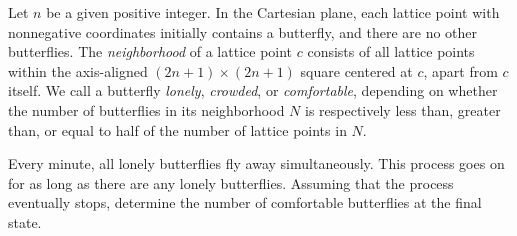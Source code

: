 Let $n$ be a given positive integer. In the Cartesian plane, each lattice point with nonnegative coordinates initially contains a butterfly, and there are no other butterflies. The \emph{neighborhood} of a lattice point $c$ consists of all lattice points within the axis-aligned $(2n+1) \times (2n+1)$ square centered at $c$, apart from $c$ itself. We call a butterfly \emph{lonely}, \emph{crowded}, or \emph{comfortable}, depending on whether the number of butterflies in its neighborhood $N$ is respectively less than, greater than, or equal to half of the number of lattice points in $N$.

Every minute, all lonely butterflies fly away simultaneously. This process goes on for as long as there are any lonely butterflies. Assuming that the process eventually stops, determine the number of comfortable butterflies at the final state.
